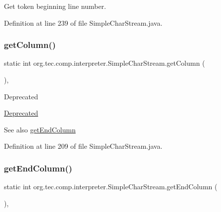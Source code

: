Get token beginning line number. 

Definition at line 239 of file Simple\+Char\+Stream.\+java.

\mbox{\label{classorg_1_1tec_1_1comp_1_1interpreter_1_1_simple_char_stream_a9551dc99ce6ef97eb9c848e7e4a6685a}} 
\subsubsection{\texorpdfstring{get\+Column()}{getColumn()}}
{\footnotesize\ttfamily static int org.\+tec.\+comp.\+interpreter.\+Simple\+Char\+Stream.\+get\+Column (\begin{DoxyParamCaption}{ }\end{DoxyParamCaption})\hspace{0.3cm}{\ttfamily [inline]}, {\ttfamily [static]}}

\begin{DoxyRefDesc}{Deprecated}
\item[\mbox{\hyperlink{deprecated__deprecated000001}{Deprecated}}]\end{DoxyRefDesc}
\begin{DoxySeeAlso}{See also}
\mbox{\hyperlink{classorg_1_1tec_1_1comp_1_1interpreter_1_1_simple_char_stream_a5420c4d6f3772d96dcae32e7293dceb8}{get\+End\+Column}} 
\end{DoxySeeAlso}


Definition at line 209 of file Simple\+Char\+Stream.\+java.

\mbox{\label{classorg_1_1tec_1_1comp_1_1interpreter_1_1_simple_char_stream_a5420c4d6f3772d96dcae32e7293dceb8}} 
\subsubsection{\texorpdfstring{get\+End\+Column()}{getEndColumn()}}
{\footnotesize\ttfamily static int org.\+tec.\+comp.\+interpreter.\+Simple\+Char\+Stream.\+get\+End\+Column (\begin{DoxyParamCaption}{ }\end{DoxyParamCaption})\hspace{0.3cm}{\ttfamily [inline]}, {\ttfamily [static]}}

